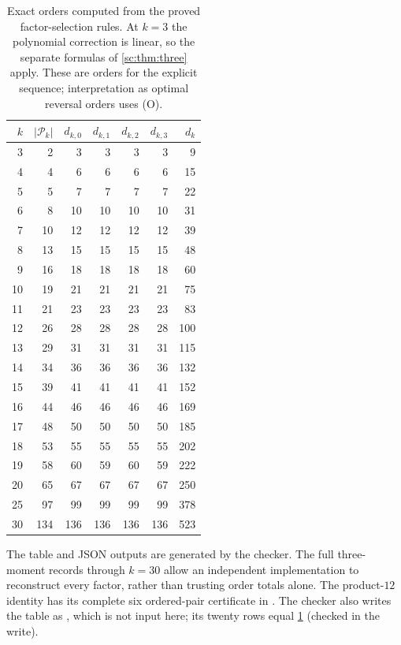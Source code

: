 \documentclass[11pt,a4paper]{article}
\numberwithin{equation}{section}
\theoremstyle{definition}
\theoremstyle{remark}
\begin{document}
\begin{table}[htbp]
\centering
\small
\begin{tabular}{@{}rrrrrrr@{}}
\toprule
$k$&$|\mathcal P_k|$&$d_{k,0}$&$d_{k,1}$&$d_{k,2}$&$d_{k,3}$&$d_k$\\\midrule
3 & 2 & 3 & 3 & 3 & 3 & 9 \\
4 & 4 & 6 & 6 & 6 & 6 & 15 \\
5 & 5 & 7 & 7 & 7 & 7 & 22 \\
6 & 8 & 10 & 10 & 10 & 10 & 31 \\
7 & 10 & 12 & 12 & 12 & 12 & 39 \\
8 & 13 & 15 & 15 & 15 & 15 & 48 \\
9 & 16 & 18 & 18 & 18 & 18 & 60 \\
10 & 19 & 21 & 21 & 21 & 21 & 75 \\
11 & 21 & 23 & 23 & 23 & 23 & 83 \\
12 & 26 & 28 & 28 & 28 & 28 & 100 \\
13 & 29 & 31 & 31 & 31 & 31 & 115 \\
14 & 34 & 36 & 36 & 36 & 36 & 132 \\
15 & 39 & 41 & 41 & 41 & 41 & 152 \\
16 & 44 & 46 & 46 & 46 & 46 & 169 \\
17 & 48 & 50 & 50 & 50 & 50 & 185 \\
18 & 53 & 55 & 55 & 55 & 55 & 202 \\
19 & 58 & 60 & 59 & 60 & 59 & 222 \\
20 & 65 & 67 & 67 & 67 & 67 & 250 \\
25 & 97 & 99 & 99 & 99 & 99 & 378 \\
30 & 134 & 136 & 136 & 136 & 136 & 523 \\
\bottomrule
\end{tabular}
\caption{Exact orders computed from the proved factor-selection rules.
At $k=3$ the polynomial correction is linear, so the separate formulas of
\cref{sc:thm:three} apply. These are orders for the explicit sequence;
interpretation as optimal reversal orders uses (O).}
\label{sc:tab:orders}
\end{table}

The table and JSON outputs are generated by the checker. The full
three-moment records through $k=30$ allow an independent implementation
to reconstruct every factor, rather than trusting order totals alone.
The product-$12$ identity has its complete six ordered-pair certificate
in . The checker also writes
the table as , which is not
input here; its twenty rows equal \cref{sc:tab:orders} (checked in the write).
\end{document}
